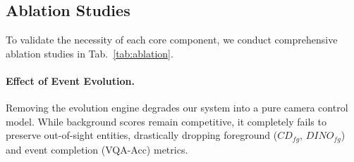 



\vspace{-3mm}
\subsection{Ablation Studies}
To validate the necessity of each core component, we conduct comprehensive ablation studies in Tab.~\ref{tab:ablation}.

\vspace{-1mm}
\paragraph{Effect of Event Evolution.} Removing the evolution engine degrades our system into a pure camera control model. While background scores remain competitive, it completely fails to preserve out-of-sight entities, drastically dropping foreground ($CD_{fg}$, $DINO_{fg}$) and event completion (VQA-Acc) metrics.

